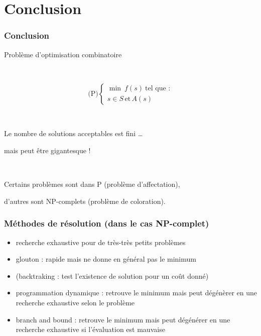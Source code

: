 \documentclass{beamer}
\begin{document}
\section{Conclusion}

\begin{frame}
  \frametitle{Conclusion}

  Problème d'optimisation combinatoire
  
  ~
  
  \[
  \text{(P)} \left\{
  \begin{array}{c}
    \min \ f(s) \ \text{tel que :} \\
    s \in S \, \text{et} \, A(s)
  \end{array}
  \right.
  \]

  ~
  
  Le nombre de solutions acceptables est fini \dots

  mais peut être gigantesque !

  ~
  
  Certains problèmes sont dans P (problème d'affectation),
  
  d'autres sont NP-complets (problème de coloration).
  
\end{frame}

\begin{frame}
  \frametitle{Méthodes de résolution (dans le cas NP-complet)}

  \begin{itemize}
  \item recherche exhaustive pour de très-très petits problèmes
  \item glouton : rapide mais ne donne en général pas le minimum
  \item (backtraking : test l'existence de solution pour un coût donné)
  \item programmation dynamique : retrouve le minimum mais peut dégénèrer en
    une recherche exhaustive selon le problème
  \item \alert{branch and bound} : retrouve le minimum mais peut dégénérer en
    une recherche exhaustive si l'évaluation est mauvaise
  \end{itemize}

\end{frame}
\end{document}
